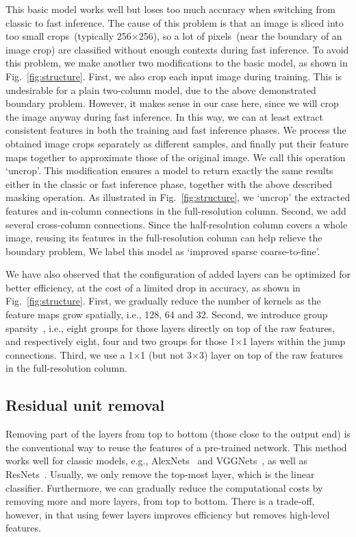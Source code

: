 \documentclass[10pt,twocolumn,letterpaper]{article}
\begin{document}
This basic model works well but loses too much accuracy when switching from classic to fast inference.
The cause of this problem is that an image is sliced into too small crops~(typically 256$\times$256),
so a lot of pixels~(near the boundary of an image crop) are classified without enough contexts during fast inference.
To avoid this problem, we make another two modifications to the basic model, as shown in Fig.~\ref{fig:structure}.
First, we also crop each input image during training.
This is undesirable for a plain two-column model,
due to the above demonstrated boundary problem.
However, it makes sense in our case here,
since we will crop the image anyway during fast inference.
In this way, we can at least extract consistent features in both the training and fast inference phases.
We process the obtained image crops separately as different samples,
and finally put their feature maps together to approximate those of the original image.
We call this operation `uncrop'.
This modification ensures a model to return exactly the same results either in the classic or fast inference phase,
together with the above described masking operation.
As illustrated in Fig.~\ref{fig:structure},
we `uncrop' the extracted features and in-column connections in the full-resolution column.
Second, we add several cross-column connections.
Since the half-resolution column covers a whole image,
reusing its features in the full-resolution column can help relieve the boundary problem,
We label this model as `improved sparse coarse-to-fine'.

We have also observed that the configuration of added layers can be optimized for better efficiency,
at the cost of a limited drop in accuracy,
as shown in Fig.~\ref{fig:structure}.
First, we gradually reduce the number of kernels as the feature maps grow spatially,
i.e., 128, 64 and 32.
Second, we introduce group sparsity~\cite{AlexNet.NIPS.2012.Krizhevsky},
i.e., eight groups for those layers directly on top of the raw features,
and respectively eight, four and two groups for those 1$\times$1 layers within the jump connections.
Third, we use a 1$\times$1 (but not 3$\times$3) layer on top of the raw features in the full-resolution column.


\subsection{Residual unit removal}
Removing part of the layers from top to bottom (those close to the output end) is the conventional way to reuse the features of a pre-trained network.
This method works well for classic models, e.g., AlexNets~\cite{AlexNet.NIPS.2012.Krizhevsky} and VGGNets~\cite{VGGNet.2014.Simonyan}, as well as ResNets~\cite{ResNet.CVPR.2016.He}.
Usually, we only remove the top-most layer, which is the linear classifier.
Furthermore, we can gradually reduce the computational costs by removing more and more layers, from top to bottom.
%
There is a trade-off, however, in that using fewer layers improves efficiency but removes high-level features.
%
\end{document}
